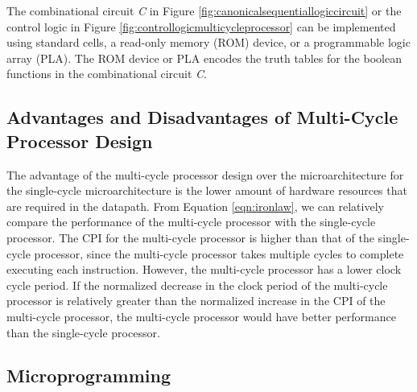 The combinational circuit {\it C} in Figure \ref{fig:canonicalsequentiallogiccircuit} or the control logic in Figure \ref{fig:controllogicmulticycleprocessor} can be implemented using standard cells\cite{Kang2003a,Rabaey2003,Weste2011}, a read-only memory (ROM) device, or a programmable logic array (PLA). The ROM device or PLA encodes the truth tables for the boolean functions in the combinational circuit {\it C}.

\subsection{Advantages and Disadvantages of Multi-Cycle Processor Design}
\label{ssec:AdvantagesandDisadvantagesofMultiCycleProcessorDesign}

The advantage of the multi-cycle processor design over the microarchitecture for the single-cycle microarchitecture is the lower amount of hardware resources that are required in the datapath. From Equation \ref{eqn:ironlaw}, we can relatively compare the performance of the multi-cycle processor with the single-cycle processor. The CPI for the multi-cycle processor is higher than that of the single-cycle processor, since the multi-cycle processor takes multiple cycles to complete executing each instruction. However, the multi-cycle processor has a lower clock cycle period. If the normalized decrease in the clock period of the multi-cycle processor is relatively greater than the normalized increase in the CPI of the multi-cycle processor, the multi-cycle processor would have better performance than the single-cycle processor.




\subsection{Microprogramming}
\label{ssec:Microprogramming}


